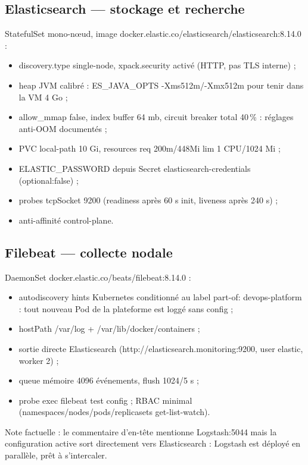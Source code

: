\documentclass[12pt,a4paper,twoside,openright]{report}
\begin{document}
\subsection{Elasticsearch --- stockage et recherche}
StatefulSet mono-nœud, image docker.elastic.co/elasticsearch/elasticsearch:8.14.0 :
\begin{itemize}[itemsep=1pt]
  \item discovery.type single-node, xpack.security activé (HTTP, pas TLS interne) ;
  \item heap JVM calibré : ES\_JAVA\_OPTS -Xms512m/-Xmx512m pour tenir dans la VM 4 Go ;
  \item allow\_mmap false, index buffer 64 mb, circuit breaker total 40\,\% : réglages anti-OOM documentés ;
  \item PVC local-path 10 Gi, resources req 200m/448Mi lim 1 CPU/1024 Mi ;
  \item ELASTIC\_PASSWORD depuis Secret elasticsearch-credentials (optional:false) ;
  \item probes tcpSocket 9200 (readiness après 60 s init, liveness après 240 s) ;
  \item anti-affinité control-plane.
\end{itemize}

\subsection{Filebeat --- collecte nodale}
DaemonSet docker.elastic.co/beats/filebeat:8.14.0 :
\begin{itemize}[itemsep=1pt]
  \item autodiscovery hints Kubernetes conditionné au label part-of: devops-platform : tout nouveau Pod de la plateforme est loggé sans config ;
  \item hostPath /var/log + /var/lib/docker/containers ;
  \item sortie directe Elasticsearch (http://elasticsearch.monitoring:9200, user elastic, worker 2) ;
  \item queue mémoire 4096 événements, flush 1024/5 s ;
  \item probe exec filebeat test config ; RBAC minimal (namespaces/nodes/pods/replicasets get-list-watch).
\end{itemize}

Note factuelle : le commentaire d'en-tête mentionne Logstash:5044 mais la configuration active sort directement vers Elasticsearch : Logstash est déployé en parallèle, prêt à s'intercaler.
\end{document}
